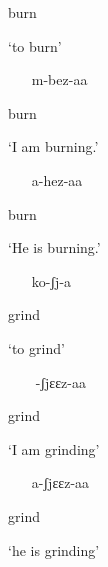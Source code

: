 \documentclass[output=paper]{langsci/langscibook}
\begin{document}
burn

\textsc{‘}to burn’

\begin{itemize}
\item [m-bez-aa]

\end{itemize}

burn

\textsc{‘}I am burning.’

\begin{itemize}
\item [a-hez-aa]

\end{itemize}

burn

\textsc{‘}He is burning.’

\begin{itemize}
\item [ko-ʃj-a]

\end{itemize}

grind

\textsc{‘}to grind’

\begin{itemize}
\item [-ʃjɛɛz-aa]

\end{itemize}

grind

\textsc{‘}I am grinding’

\begin{itemize}
\item [a-ʃjɛɛz-aa]

\end{itemize}

grind

\textsc{‘}he is grinding’
\end{document}
